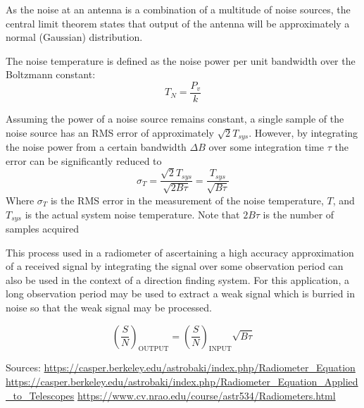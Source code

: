As the noise at an antenna is a combination of a multitude of noise sources, the central limit theorem states that output of the antenna will be approximately a normal (Gaussian) distribution. 

The noise temperature is defined as the noise power per unit bandwidth over the Boltzmann constant:
\begin{equation}
  T_N = \frac{P_v}{k}
\end{equation}

Assuming the power of a noise source remains constant, a single sample of the noise source has an RMS error of approximately \(\sqrt{2}T_{sys}\). However, by integrating the noise power from a certain bandwidth \(\Delta B\) over some integration time \(\tau\) the error can be significantly reduced to
\begin{equation}
  \sigma_{T} = \frac{\sqrt{2}T_{sys}}{\sqrt{2B\tau}} = \frac{T_{sys}}{\sqrt{B \tau}}
\end{equation}
Where \(\sigma_{T}\) is the RMS error in the measurement of the noise temperature, \(T\), and \(T_{sys}\) is the actual system noise temperature. Note that \(2B\tau\) is the number of samples acquired

This process used in a radiometer of ascertaining a high accuracy approximation of a received signal by integrating the signal over some observation period can also be used in the context of a direction finding system. For this application, a long observation period may be used to extract a weak signal which is burried in noise so that the weak signal may be processed.

\begin{equation}
  \left( \frac{S}{N} \right)_{\text{OUTPUT}} = \left( \frac{S}{N} \right)_{\text{INPUT}}\sqrt{B\tau}
\end{equation}

Sources: \url{https://casper.berkeley.edu/astrobaki/index.php/Radiometer_Equation}
\url{https://casper.berkeley.edu/astrobaki/index.php/Radiometer_Equation_Applied_to_Telescopes}
\url{https://www.cv.nrao.edu/course/astr534/Radiometers.html}

